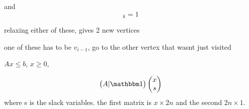 \documentclass{article}
\theoremstyle{definition}
\begin{document}
and
\begin{equation}
    [Av_i]_k=1
\end{equation}

relaxing either of these, gives 2 new vertices

one of these has to be \(v_{i-1}\), go to the other vertex that wasnt just visited

\(Ax\leq b\), \(x\geq 0\),

\begin{equation}
    \begin{pmatrix}
        A|\mathbbm 1 
    \end{pmatrix}
    \begin{pmatrix}
        x\\
        s
    \end{pmatrix}
\end{equation}
where s is the slack variables. the first matrix is \(x\times 2n\) and the second \(2n\times 1\).
\end{document}
